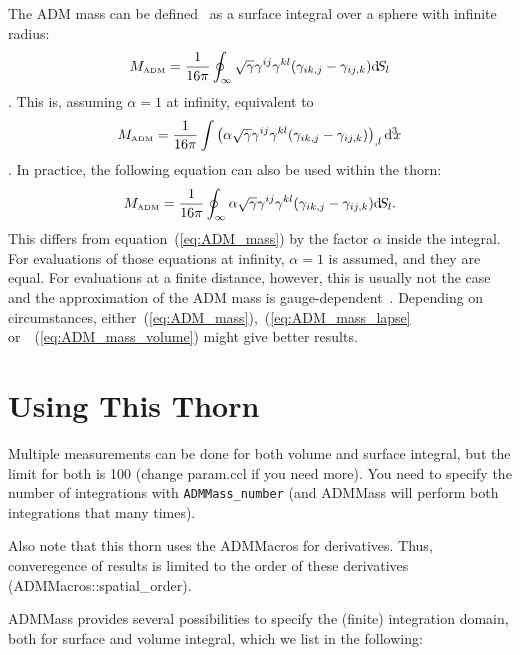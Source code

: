  The ADM mass can be defined~\cite{ADM_mass_Omurchadha74} as a surface integral over a
 sphere with infinite radius:
 \begin{equation}
 \label{eq:ADM_mass}
  M_{\mbox{\tiny ADM}}=\frac{1}{16\pi}\oint_\infty
  \sqrt{\gamma}\gamma^{ij}\gamma^{kl}
  (\gamma_{ik,j}-\gamma_{ij,k})\text{d}\! S_l
 \end{equation}.
 This is, assuming $\alpha=1$ at infinity, equivalent to
 \begin{equation}
 \label{eq:ADM_mass_volume}
  M_{\mbox{\tiny ADM}}=\frac{1}{16\pi}\int
  \left(\alpha\sqrt{\gamma}\gamma^{ij}\gamma^{kl}
  (\gamma_{ik,j}-\gamma_{ij,k})\right)_{,l}\text{d}\!^{\,3}\!\!x
 \end{equation}.
In practice, the following equation can also be used within the thorn:
  \begin{equation}
   \label{eq:ADM_mass_lapse}
   M_{\mbox{\tiny ADM}}=\frac{1}{16\pi}\oint_\infty
   \alpha\sqrt{\gamma}\gamma^{ij}\gamma^{kl}
   (\gamma_{ik,j}-\gamma_{ij,k})\text{d}\! S_l.
  \end{equation}
  This differs from equation~(\ref{eq:ADM_mass}) by the factor $\alpha$ inside
  the integral. For evaluations of those equations at infinity, $\alpha=1$ is
  assumed, and they are equal. For evaluations at a finite distance, however,
  this is usually not the case and the approximation of the ADM mass is
  gauge-dependent~\cite{ADM_mass_Omurchadha74}. Depending on circumstances,
  either~(\ref{eq:ADM_mass}),~(\ref{eq:ADM_mass_lapse} or~~(\ref{eq:ADM_mass_volume})
  might give better results.

\section{Using This Thorn}

Multiple measurements can be done for both volume and surface integral, but the
limit for both is 100 (change param.ccl if you need more). You need to
specify the number of integrations with \texttt{ADMMass\_number} (and ADMMass
will perform both integrations that many times).

Also note that this thorn uses the ADMMacros for derivatives. Thus, converegence
of results is limited to the order of these derivatives (ADMMacros::spatial\_order).

ADMMass provides several possibilities to specify the (finite) integration domain,
both for surface and volume integral, which we list in the following:

